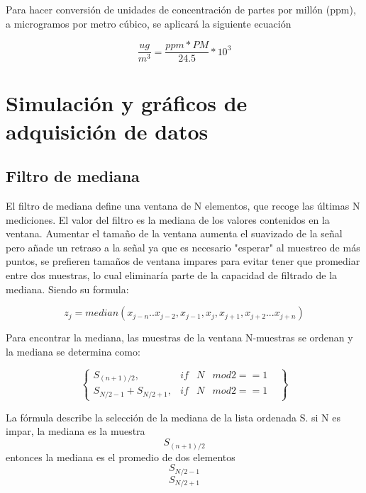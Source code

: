 \documentclass[10pt,a4paper]{article}
\begin{document}
Para hacer conversión de unidades de concentración de partes por millón (ppm), a microgramos por metro cúbico, se aplicará la siguiente ecuación
	
\begin{equation}
\frac{ug}{m^{3}}= \frac{ppm * PM}{24.5}*10^{3}
\end{equation} 

\section{Simulación y gráficos de adquisición de datos }
\subsection{Filtro de mediana}

El filtro de mediana define una ventana de N elementos, que recoge las últimas N mediciones. El valor del filtro es la mediana de los valores contenidos en la ventana.
Aumentar el tamaño de la ventana aumenta el suavizado de la señal pero añade un retraso a la señal ya que es necesario "esperar" al muestreo de más puntos, se prefieren tamaños de ventana impares para evitar tener que promediar entre dos muestras, lo cual eliminaría parte de la capacidad de filtrado de la mediana. Siendo su formula:

\begin{equation}
z_{j}=median (x_{j-n}..x_{j-2},x_{j-1},x_{j},x_{j+1},x_{j+2}...x_{j+n})
\end{equation}

Para encontrar la mediana, las muestras de la ventana N-muestras se ordenan y la mediana se determina como:

\begin{equation}
\begin{Bmatrix}
S_{(n+1)/2} , & if  & N & mod 2==1 & \\
S_{N/2-1}+S_{N/2+1}, & if  &  N &  mod 2==1 & 
\end{Bmatrix}
\end{equation}

La fórmula describe la selección de la mediana de la lista ordenada S. si N es impar, la mediana es la muestra 
\begin{equation}
 S_{(n+1)/2} 
\end{equation}
 entonces la mediana es el promedio de dos elementos 
\begin{equation}
S_{N/2-1}  
 \end{equation} 
\begin{equation}
S_{N/2+1}
 \end{equation} 
\end{document}
